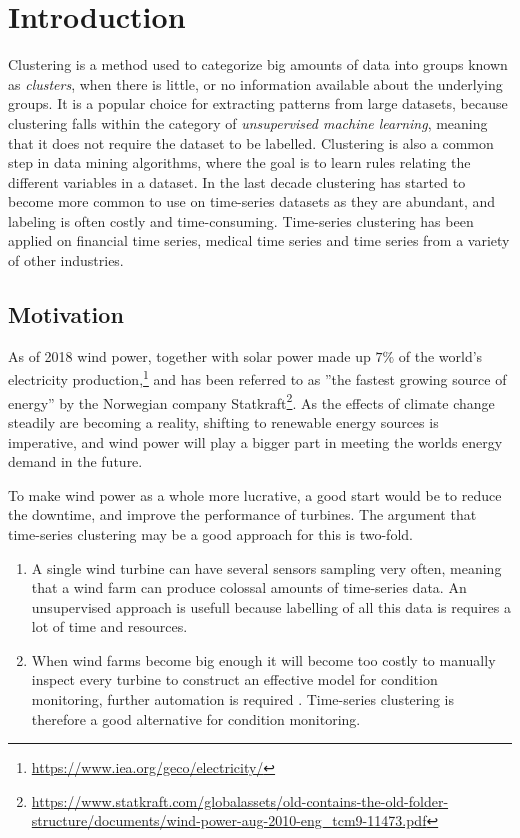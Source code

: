 \chapter{Introduction}

Clustering is a method used to categorize big amounts of data into groups known as \textit{clusters}, when there is little, or no information available about the underlying groups. 
It is a popular choice for extracting patterns from large datasets, because clustering falls within the category of \textit{unsupervised machine learning}, meaning that it does not require the dataset to be labelled. 
Clustering is also a common step in data mining algorithms, where the goal is to learn rules relating the different variables in a dataset. 
In the last decade clustering has started to become more common to use on time-series datasets as they are abundant, and labeling is often costly and time-consuming. 
Time-series clustering has been applied on financial time series, medical time series and time series from a variety of other industries. \bigskip

\section{Motivation}

As of 2018 wind power, together with solar power made up $7\%$ of the world's electricity production,\footnote{\url{https://www.iea.org/geco/electricity/}} and has been referred to as ''the fastest growing source of energy'' by the Norwegian company Statkraft\footnote{\url{https://www.statkraft.com/globalassets/old-contains-the-old-folder-structure/documents/wind-power-aug-2010-eng_tcm9-11473.pdf}}. 
As the effects of climate change steadily are becoming a reality, shifting to renewable energy sources is imperative, and wind power will play a bigger part in meeting the worlds energy demand in the future. \bigskip

To make wind power as a whole more lucrative, a good start would be to reduce the downtime, and improve the performance of turbines. The argument that time-series clustering may be a good approach for this is two-fold. 

\begin{enumerate}
    \item A single wind turbine can have several sensors sampling very often, meaning that a wind farm can produce colossal amounts of time-series data. An unsupervised approach is usefull because labelling of all this data is requires a lot of time and resources.
    \item When wind farms become big enough it will become too costly to manually inspect every turbine to construct an effective model for condition monitoring, further automation is required \cite{espen}. Time-series clustering is therefore a good alternative for condition monitoring.
\end{enumerate}


